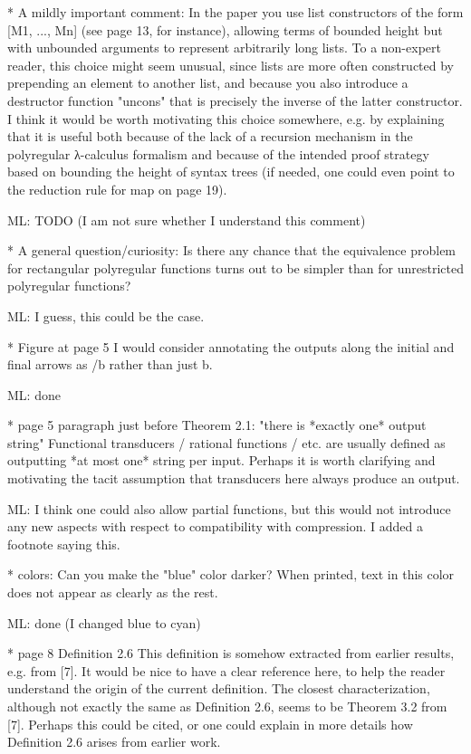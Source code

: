 * A mildly important comment:
In the paper you use list constructors of the form [M1, ..., Mn] (see page 13, for instance), allowing terms of bounded height but 
with unbounded arguments to represent arbitrarily long lists. To a non-expert reader, this choice might seem unusual, since lists 
are more often constructed by prepending an element to another list, and because you also introduce a destructor function "uncons" 
that is precisely the inverse of the latter constructor.
I think it would be worth motivating this choice somewhere, e.g. by explaining that it is useful both because of the lack of a 
recursion mechanism in the polyregular λ-calculus formalism and because of the intended proof strategy based on bounding the height 
of syntax trees (if needed, one could even point to the reduction rule for map on page 19).

ML: TODO (I am not sure whether I understand this comment)

* A general question/curiosity: 
Is there any chance that the equivalence problem for rectangular polyregular functions turns out to be simpler than for unrestricted 
polyregular functions?

ML: I guess, this could be the case.

* Figure at page 5
I would consider annotating the outputs along the initial and final arrows as /b rather than just b.

ML: done 

* page 5 paragraph just before Theorem 2.1: "there is *exactly one* output string"
Functional transducers / rational functions / etc. are usually defined as outputting *at most one* string per input. 
Perhaps it is worth clarifying and motivating the tacit assumption that transducers here always produce an output.

ML: I think one could also allow partial functions, but  this would not introduce any new aspects with respect to compatibility with compression.
I added a footnote saying this.

* colors: 
Can you make the "blue" color darker? When printed, text in this color does not appear as clearly as the rest.

ML: done (I changed blue to cyan)

* page 8 Definition 2.6
This definition is somehow extracted from earlier results, e.g. from [7]. It would be nice to have a clear reference 
here, to help the reader understand the origin of the current definition. The closest characterization, although not 
exactly the same as Definition 2.6, seems to be Theorem 3.2 from [7]. Perhaps this could be cited, or one could 
explain in more details how Definition 2.6 arises from earlier work.

